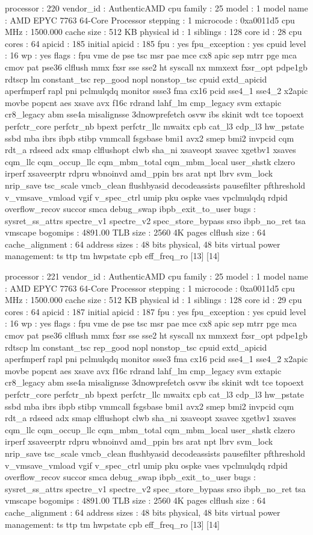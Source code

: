 processor	: 220
vendor_id	: AuthenticAMD
cpu family	: 25
model		: 1
model name	: AMD EPYC 7763 64-Core Processor
stepping	: 1
microcode	: 0xa0011d5
cpu MHz		: 1500.000
cache size	: 512 KB
physical id	: 1
siblings	: 128
core id		: 28
cpu cores	: 64
apicid		: 185
initial apicid	: 185
fpu		: yes
fpu_exception	: yes
cpuid level	: 16
wp		: yes
flags		: fpu vme de pse tsc msr pae mce cx8 apic sep mtrr pge mca cmov pat pse36 clflush mmx fxsr sse sse2 ht syscall nx mmxext fxsr_opt pdpe1gb rdtscp lm constant_tsc rep_good nopl nonstop_tsc cpuid extd_apicid aperfmperf rapl pni pclmulqdq monitor ssse3 fma cx16 pcid sse4_1 sse4_2 x2apic movbe popcnt aes xsave avx f16c rdrand lahf_lm cmp_legacy svm extapic cr8_legacy abm sse4a misalignsse 3dnowprefetch osvw ibs skinit wdt tce topoext perfctr_core perfctr_nb bpext perfctr_llc mwaitx cpb cat_l3 cdp_l3 hw_pstate ssbd mba ibrs ibpb stibp vmmcall fsgsbase bmi1 avx2 smep bmi2 invpcid cqm rdt_a rdseed adx smap clflushopt clwb sha_ni xsaveopt xsavec xgetbv1 xsaves cqm_llc cqm_occup_llc cqm_mbm_total cqm_mbm_local user_shstk clzero irperf xsaveerptr rdpru wbnoinvd amd_ppin brs arat npt lbrv svm_lock nrip_save tsc_scale vmcb_clean flushbyasid decodeassists pausefilter pfthreshold v_vmsave_vmload vgif v_spec_ctrl umip pku ospke vaes vpclmulqdq rdpid overflow_recov succor smca debug_swap ibpb_exit_to_user
bugs		: sysret_ss_attrs spectre_v1 spectre_v2 spec_store_bypass srso ibpb_no_ret tsa vmscape
bogomips	: 4891.00
TLB size	: 2560 4K pages
clflush size	: 64
cache_alignment	: 64
address sizes	: 48 bits physical, 48 bits virtual
power management: ts ttp tm hwpstate cpb eff_freq_ro [13] [14]

processor	: 221
vendor_id	: AuthenticAMD
cpu family	: 25
model		: 1
model name	: AMD EPYC 7763 64-Core Processor
stepping	: 1
microcode	: 0xa0011d5
cpu MHz		: 1500.000
cache size	: 512 KB
physical id	: 1
siblings	: 128
core id		: 29
cpu cores	: 64
apicid		: 187
initial apicid	: 187
fpu		: yes
fpu_exception	: yes
cpuid level	: 16
wp		: yes
flags		: fpu vme de pse tsc msr pae mce cx8 apic sep mtrr pge mca cmov pat pse36 clflush mmx fxsr sse sse2 ht syscall nx mmxext fxsr_opt pdpe1gb rdtscp lm constant_tsc rep_good nopl nonstop_tsc cpuid extd_apicid aperfmperf rapl pni pclmulqdq monitor ssse3 fma cx16 pcid sse4_1 sse4_2 x2apic movbe popcnt aes xsave avx f16c rdrand lahf_lm cmp_legacy svm extapic cr8_legacy abm sse4a misalignsse 3dnowprefetch osvw ibs skinit wdt tce topoext perfctr_core perfctr_nb bpext perfctr_llc mwaitx cpb cat_l3 cdp_l3 hw_pstate ssbd mba ibrs ibpb stibp vmmcall fsgsbase bmi1 avx2 smep bmi2 invpcid cqm rdt_a rdseed adx smap clflushopt clwb sha_ni xsaveopt xsavec xgetbv1 xsaves cqm_llc cqm_occup_llc cqm_mbm_total cqm_mbm_local user_shstk clzero irperf xsaveerptr rdpru wbnoinvd amd_ppin brs arat npt lbrv svm_lock nrip_save tsc_scale vmcb_clean flushbyasid decodeassists pausefilter pfthreshold v_vmsave_vmload vgif v_spec_ctrl umip pku ospke vaes vpclmulqdq rdpid overflow_recov succor smca debug_swap ibpb_exit_to_user
bugs		: sysret_ss_attrs spectre_v1 spectre_v2 spec_store_bypass srso ibpb_no_ret tsa vmscape
bogomips	: 4891.00
TLB size	: 2560 4K pages
clflush size	: 64
cache_alignment	: 64
address sizes	: 48 bits physical, 48 bits virtual
power management: ts ttp tm hwpstate cpb eff_freq_ro [13] [14]

